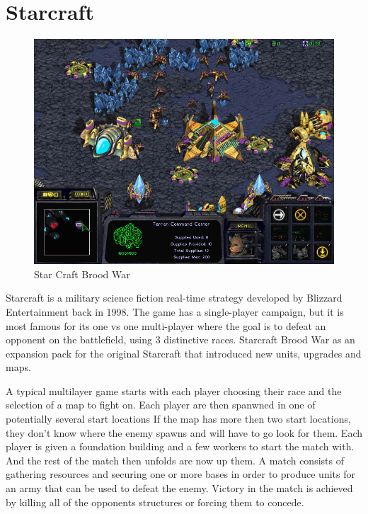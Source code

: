 
\section{Starcraft}

\begin{figure}[h!tb]
\centering
\includegraphics[scale=0.5]{graphics/scbw.jpg}
\caption{Star Craft Brood War}
\label{fig:scbwIntro}
\end{figure}

Starcraft is a military science fiction real-time strategy developed by Blizzard Entertainment back in 1998.\cite{starcraft} The game has a single-player campaign, but it is most famous for its one vs one multi-player where the goal is to defeat an opponent on the battlefield, using 3 distinctive races. Starcraft Brood War as an expansion pack for the original Starcraft that introduced new units, upgrades and maps. 

A typical multilayer game starts with each player choosing their race and the selection of a map to fight on. Each player are then spanwned in one of potentially several start locations If the map has more then two start locations, they don't know where the enemy spawns and will have to go look for them. Each player is given a foundation building and a few workers to start the match with. And the rest of the match then unfolds are now up them. A match consists of gathering resources and securing one or more bases in order to produce units for an army that can be used to defeat the enemy. Victory in the match is achieved by killing all of the opponents structures or forcing them to concede. 


